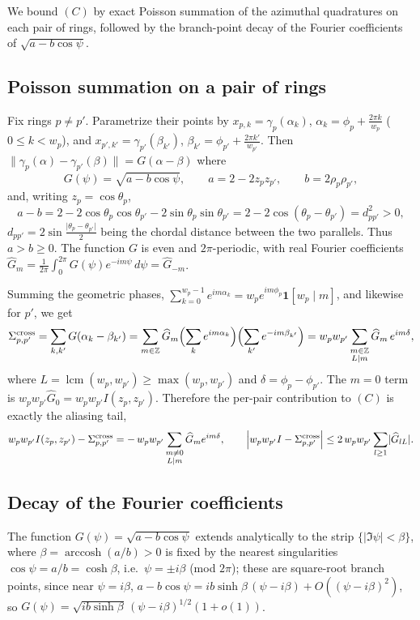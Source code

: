 \documentclass[11pt,reqno]{amsart}
\theoremstyle{definition}
\newcommand{\Z}{\mathbb{Z}}
\newcommand{\dist}[2]{\lVert #1-#2\rVert}
\DeclareMathOperator{\arccosh}{arccosh}
\DeclareMathOperator{\lcm}{lcm}
\newcommand{\abs}[1]{\lvert #1\rvert}
\newcommand{\rp}{\rho}
\begin{document}
We bound $(C)$ by exact Poisson summation of the azimuthal quadratures on each pair of rings,
followed by the branch-point decay of the Fourier coefficients of $\sqrt{a-b\cos\psi}$.

\subsection{Poisson summation on a pair of rings}
Fix rings $p\ne p'$. Parametrize their points by
$x_{p,k}=\gamma_p(\alpha_k)$, $\alpha_k=\phi_p+\frac{2\pi k}{w_p}$ ($0\le k<w_p$), and
$x_{p',k'}=\gamma_{p'}(\beta_{k'})$, $\beta_{k'}=\phi_{p'}+\frac{2\pi k'}{w_{p'}}$. Then
$\dist{\gamma_p(\alpha)}{\gamma_{p'}(\beta)}=G(\alpha-\beta)$ where
\begin{equation}\label{eq:G}
   G(\psi)=\sqrt{a-b\cos\psi},\qquad a=2-2z_pz_{p'},\qquad b=2\rp_p\rp_{p'},
\end{equation}
and, writing $z_p=\cos\theta_p$,
\[
   a-b=2-2\cos\theta_p\cos\theta_{p'}-2\sin\theta_p\sin\theta_{p'}=2-2\cos(\theta_p-\theta_{p'})
      =d_{pp'}^2>0,
\]
$d_{pp'}=2\sin\frac{\abs{\theta_p-\theta_{p'}}}{2}$ being the chordal distance between the two
parallels. Thus $a>b\ge0$. The function $G$ is even and $2\pi$-periodic, with real Fourier
coefficients $\widehat G_m=\frac{1}{2\pi}\int_0^{2\pi}G(\psi)e^{-im\psi}\,d\psi=\widehat G_{-m}$.

Summing the geometric phases,
$\sum_{k=0}^{w_p-1}e^{im\alpha_k}=w_p e^{im\phi_p}\mathbf 1[w_p\mid m]$, and likewise for $p'$, we get
\[
   \Sigma_{p,p'}^{\mathrm{cross}}=\sum_{k,k'}G(\alpha_k-\beta_{k'})
   =\sum_{m\in\Z}\widehat G_m\Bigl(\sum_k e^{im\alpha_k}\Bigr)\Bigl(\sum_{k'}e^{-im\beta_{k'}}\Bigr)
   =w_pw_{p'}\sum_{\substack{m\in\Z\\ L\mid m}}\widehat G_m\,e^{im\delta},
\]
where $L=\lcm(w_p,w_{p'})\ge\max(w_p,w_{p'})$ and $\delta=\phi_p-\phi_{p'}$. The $m=0$ term is
$w_pw_{p'}\widehat G_0=w_pw_{p'}I(z_p,z_{p'})$. Therefore the per-pair contribution to $(C)$ is
exactly the aliasing tail,
\begin{equation}\label{eq:pairtail}
   w_pw_{p'}I(z_p,z_{p'})-\Sigma_{p,p'}^{\mathrm{cross}}
   =-\,w_pw_{p'}\sum_{\substack{m\ne0\\ L\mid m}}\widehat G_m e^{im\delta},
   \qquad
   \Bigl\lvert w_pw_{p'}I-\Sigma_{p,p'}^{\mathrm{cross}}\Bigr\rvert
   \le 2\,w_pw_{p'}\sum_{l\ge1}\abs{\widehat G_{lL}} .
\end{equation}

\subsection{Decay of the Fourier coefficients}
The function $G(\psi)=\sqrt{a-b\cos\psi}$ extends analytically to the strip
$\{\abs{\Im\psi}<\beta\}$, where $\beta=\arccosh(a/b)>0$ is fixed by the nearest singularities
$\cos\psi=a/b=\cosh\beta$, i.e.\ $\psi=\pm i\beta$ (mod $2\pi$); these are square-root branch points,
since near $\psi=i\beta$, $a-b\cos\psi=ib\sinh\beta\,(\psi-i\beta)+O((\psi-i\beta)^2)$, so
$G(\psi)=\sqrt{ib\sinh\beta}\,(\psi-i\beta)^{1/2}(1+o(1))$.
\end{document}
